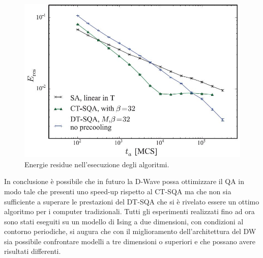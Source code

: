 \begin{figure}[htbp]
  \centering
  \includegraphics[scale=0.6]{Immagini/residua.jpg}
  \caption{Energie residue nell'esecuzione degli algoritmi.}
  \label{figura:residua}
\end{figure}

In conclusione è possibile che in futuro la D-Wave possa ottimizzare il QA in modo tale che presenti uno speed-up rispetto al CT-SQA ma che non sia sufficiente a superare le prestazioni del DT-SQA che si è rivelato essere un ottimo algoritmo per i computer tradizionali. Tutti gli esperimenti realizzati fino ad ora sono stati eseguiti su un modello di Ising a due dimensioni, con condizioni al contorno periodiche, si augura che con il miglioramento dell'architettura del DW sia possibile confrontare modelli a tre dimensioni o superiori e che possano avere risultati differenti.
